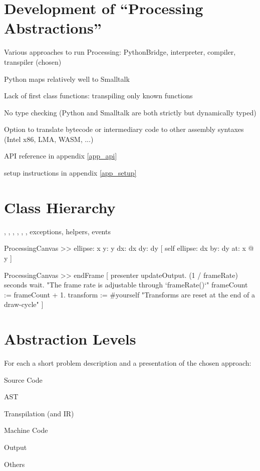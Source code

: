 \section{Development of ``Processing Abstractions''}

\begin{todo}
\item Various approaches to run Processing: PythonBridge, interpreter, compiler, transpiler (chosen)
\item Python maps relatively well to Smalltalk
\item Lack of first class functions: transpiling only known functions
\item No type checking (Python and Smalltalk are both strictly but dynamically typed)
\item Option to translate bytecode or intermediary code to other assembly syntaxes (Intel x86, LMA, WASM, ...)
\item API reference in appendix \ref{app_api}
\item setup instructions in appendix \ref{app_setup}
\end{todo}

\section{Class Hierarchy}

\begin{todo}
\item {}, , , , , ,  exceptions, helpers, events
\end{todo}


\begin{code}
ProcessingCanvas >> ellipse: x y: y dx: dx dy: dy [
	self
		ellipse: dx
		by: dy
		at: x @ y
]
\end{code}


\begin{code}
ProcessingCanvas >> endFrame [
	presenter updateOutput.
	(1 / frameRate) seconds wait.	"The frame rate is adjustable through `frameRate()`"
	frameCount := frameCount + 1.
	transform := #yourself	"Transforms are reset at the end of a draw-cycle"
]
\end{code}


\section{Abstraction Levels}
For each a short problem description and a presentation of the chosen approach:

\begin{todo}
\item Source Code
\item AST
\item Transpilation (and IR)
\item Machine Code
\item Output
\item Others
\end{todo}
